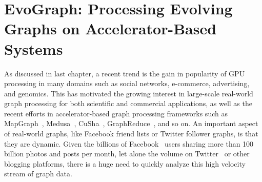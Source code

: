 \chapter{EvoGraph: Processing Evolving Graphs on Accelerator-Based Systems}

As discussed in last chapter, a recent trend is the gain in popularity of GPU processing in many domains such as social networks, e-commerce, advertising, and genomics. This has motivated the growing interest in large-scale real-world graph processing for both scientific and commercial applications, as well as the recent efforts in accelerator-based graph processing frameworks such as MapGraph~\cite{mapgraph}, Medusa~\cite{medusa}, CuSha~\cite{cusha}, GraphReduce~\cite{GraphReduce}, and so on. An important aspect of real-world graphs, like Facebook friend lists or Twitter follower graphs, is that they are dynamic.  Given the billions of Facebook~\cite{linkbench} users sharing more than 100 billion photos and posts per month, let alone the volume on Twitter~\cite{twitter} or other blogging platforms, there is a huge need to quickly analyze this high velocity stream of graph data. 


